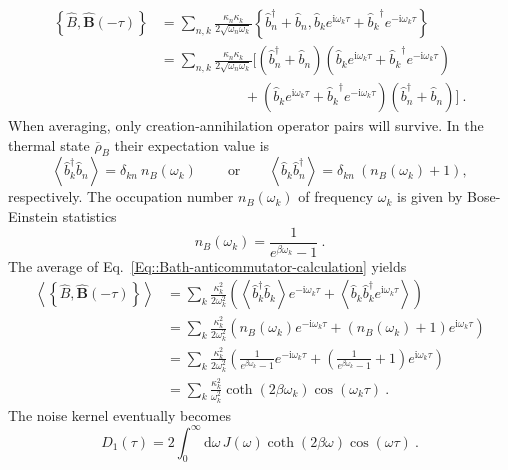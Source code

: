 	\begin{equation}
		\begin{split} \label{Eq::Bath-anticommutator-calculation}
			\left\{\hat{B}, \boldsymbol{\hat{B}}(-\tau) \right\} &=	\sum_{n,k}^{} \frac{\kappa_n \kappa_k}{2 \sqrt{\omega_n \omega_k}} \left\{\hat{b}_n^\dagger + \hat{b}_n , {\hat{b}_k}e^{\mathrm{i} \omega_k \tau} + {\hat{b}_k}^\dagger e^{-\mathrm{i} \omega_k \tau} \right\} \\
			&= \sum_{n,k}^{} \frac{\kappa_n \kappa_k}{2 \sqrt{\omega_n \omega_k}} \bigg[ \left(\hat{b}_n^\dagger + \hat{b}_n \right) \left( {\hat{b}_k}e^{\mathrm{i} \omega_k \tau} + {\hat{b}_k}^\dagger e^{-\mathrm{i} \omega_k \tau} \right) \\
			& \qquad \qquad \qquad +   \left( {\hat{b}_k}e^{\mathrm{i} \omega_k \tau} + {\hat{b}_k}^\dagger e^{-\mathrm{i} \omega_k \tau} \right) \left(\hat{b}_n^\dagger + \hat{b}_n \right) \bigg]~.
		\end{split}
	\end{equation}
	When averaging, only creation-annihilation operator pairs will survive. In the thermal state $\overline{\rho}_B$ their expectation value is 
	\begin{equation}
		\left \langle \hat{b}^\dagger_k  \hat{b}_n \right \rangle =	\delta_{kn}~n_B (\omega_k)~ \qquad \text{or} \qquad \left \langle \hat{b}_k  \hat{b}_n^\dagger \right \rangle =	\delta_{kn}~(n_B (\omega_k) + 1),
	\end{equation}
	respectively. The occupation number $n_B(\omega_k)$ of frequency $\omega_k$ is given by Bose-Einstein statistics
	\begin{equation}
		n_B(\omega_k) =	\frac{1}{e^{\beta \omega_k} - 1}~.
	\end{equation}
	  The average of Eq.~\eqref{Eq::Bath-anticommutator-calculation} yields
	\begin{equation}
		\begin{split}
			\left \langle \left\{\hat{B}, \boldsymbol{\hat{B}}(-\tau) \right\} \right \rangle &=	 \sum_{k}^{} \frac{\kappa_k^2 }{2 {\omega_k^2}} \left(\left\langle \hat{b}_k^\dagger \hat{b}_k \right\rangle e^{-\mathrm{i} \omega_k \tau}   + \left\langle \hat{b}_k\hat{b}_k^\dagger  e^{\mathrm{i} \omega_k \tau} \right\rangle \right)   \\
			&=	 \sum_{k}^{} \frac{\kappa_k^2 }{2 {\omega_k^2}} \left( n_B(\omega_k) e^{-\mathrm{i} \omega_k \tau}   + (n_B(\omega_k) + 1) e^{\mathrm{i} \omega_k \tau} \right)  \\
			&=	 \sum_{k}^{} \frac{\kappa_k^2 }{2 {\omega_k^2}} \left( \frac{1}{e^{\beta \omega_k} - 1} e^{-\mathrm{i} \omega_k \tau}   + \left(\frac{1}{e^{\beta \omega_k} - 1} + 1\right) e^{\mathrm{i} \omega_k \tau} \right) \\ 
			&=	 \sum_{k}^{} \frac{\kappa_k^2 }{ {\omega_k^2}} \coth(2 \beta \omega_k) \cos(\omega_k \tau)~.
		\end{split}
	\end{equation}
	The noise kernel eventually becomes
	\begin{equation}
		D_1(\tau) =	2 \int_0^\infty \text{d} \omega\, J(\omega) \coth \left(2\beta \omega\right) \cos \left(\omega \tau \right) ~.
	\end{equation}

